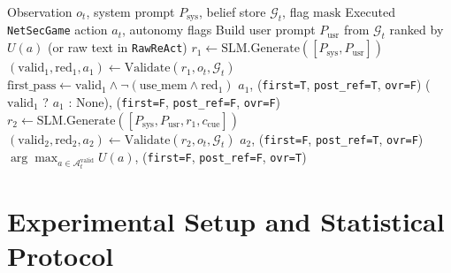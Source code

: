 \documentclass[a4paper,fleqn]{cas-dc}
\begin{document}
\begin{algorithm}[t]
\caption{SLM Decision Loop with 1-Step Reflexion \& Minimax Fallback}
\label{alg:reflexion}
\begin{algorithmic}[1]
\Require Observation $o_t$, system prompt $P_{\mathrm{sys}}$, belief store $\mathcal{G}_t$, flag $\mathrm{mask}$
\Ensure Executed \texttt{NetSecGame} action $a_t$, autonomy flags
\State Build user prompt $P_{\mathrm{usr}}$ from $\mathcal{G}_t$ ranked by $U(a)$ (or raw text in \texttt{RawReAct})
\State $r_1 \leftarrow \mathrm{SLM.Generate}([P_{\mathrm{sys}}, P_{\mathrm{usr}}])$ 
\State $(\mathrm{valid}_1, \mathrm{red}_1, a_1) \leftarrow \mathrm{Validate}(r_1, o_t, \mathcal{G}_t)$
\State $\mathrm{first\_pass} \leftarrow \mathrm{valid}_1 \land \neg(\mathrm{use\_mem} \land \mathrm{red}_1)$
    \State \Return $a_1$, (\texttt{first=T}, \texttt{post\_ref=T}, \texttt{ovr=F})
    \State \Return ($\mathrm{valid}_1$ ? $a_1$ : $\mathrm{None}$), (\texttt{first=F}, \texttt{post\_ref=F}, \texttt{ovr=F})
\EndIf
\State $r_2 \leftarrow \mathrm{SLM.Generate}([P_{\mathrm{sys}}, P_{\mathrm{usr}}, r_1, c_{\mathrm{cue}}])$ 
\State $(\mathrm{valid}_2, \mathrm{red}_2, a_2) \leftarrow \mathrm{Validate}(r_2, o_t, \mathcal{G}_t)$
    \State \Return $a_2$, (\texttt{first=F}, \texttt{post\_ref=T}, \texttt{ovr=F})
\Else
    \State \Return $\arg\max_{a \in \mathcal{A}^{\mathrm{valid}}_t} U(a)$, (\texttt{first=F}, \texttt{post\_ref=F}, \texttt{ovr=T})
\EndIf
\end{algorithmic}
\end{algorithm}

\section{Experimental Setup and Statistical Protocol}
\label{sec:setup}
\end{document}
